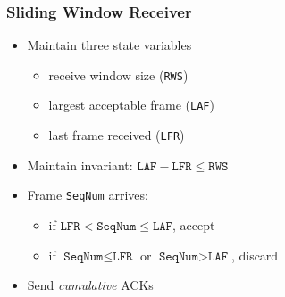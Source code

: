 \subsubsection{Sliding Window Receiver}
\begin{itemize}
    \item Maintain three state variables
          \begin{itemize}[nosep]
              \item receive window size (\texttt{RWS})
              \item largest acceptable frame (\texttt{LAF})
              \item last frame received (\texttt{LFR})
          \end{itemize}
    \item Maintain invariant: $\texttt{LAF} - \texttt{LFR} \leq \texttt{RWS}$
    \item Frame \texttt{SeqNum} arrives:
          \begin{itemize}[nosep]
              \item if $\texttt{LFR} < \texttt{SeqNum} \leq \texttt{LAF}$, accept
              \item if $\texttt{SeqNum} \leq \texttt{LFR}$ or $\texttt{SeqNum} > \texttt{LAF}$, discard
          \end{itemize}
    \item Send \emph{cumulative} ACKs
\end{itemize}